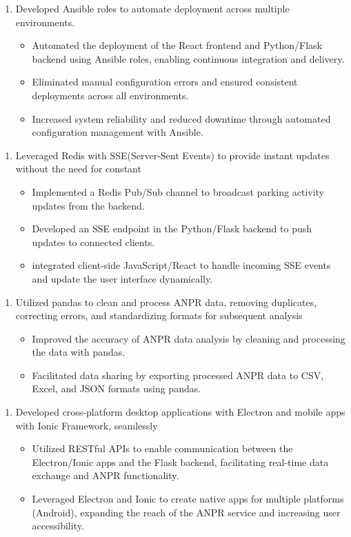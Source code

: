 \documentclass{article}
\begin{document}
\begin{enumerate}
    \item[] Developed Ansible roles to automate deployment across multiple environments.
   \begin{itemize}
    \item Automated the deployment of the React frontend and Python/Flask backend using Ansible roles, enabling continuous integration and delivery.
    \item Eliminated manual configuration errors and ensured consistent deployments across all environments.  
    \item Increased system reliability and reduced downtime through automated configuration management with Ansible.
   \end{itemize}
\end{enumerate}

\begin{enumerate}
    \item[]  Leveraged Redis with SSE(Server-Sent Events) to provide instant updates without the need for constant
    \begin{itemize}
    \item Implemented a Redis Pub/Sub channel to broadcast parking activity updates from the backend.
    \item Developed an SSE endpoint in the Python/Flask backend to push updates to connected clients.
    \item integrated client-side JavaScript/React  to handle incoming SSE events and update the user interface dynamically.
    \end{itemize}
 \end{enumerate}


\begin{enumerate}
    \item[] Utilized pandas to clean and process ANPR data,  removing duplicates, correcting errors, and standardizing formats for subsequent analysis
   \begin{itemize}
    \item Improved the accuracy of ANPR data analysis by  cleaning and processing the data with pandas. 
    \item Facilitated data sharing  by exporting processed ANPR data to CSV, Excel, and JSON formats using pandas.
   \end{itemize}
\end{enumerate}


\begin{enumerate}
    \item[]  Developed cross-platform desktop applications with Electron and mobile apps with Ionic Framework, seamlessly
   \begin{itemize}
    \item Utilized RESTful APIs to enable communication between the Electron/Ionic apps and the Flask backend, facilitating real-time data exchange and ANPR functionality.
    \item Leveraged Electron and Ionic to create native apps for multiple platforms (Android), expanding the reach of the ANPR service and increasing user accessibility.
   \end{itemize}
\end{enumerate}
\end{document}
